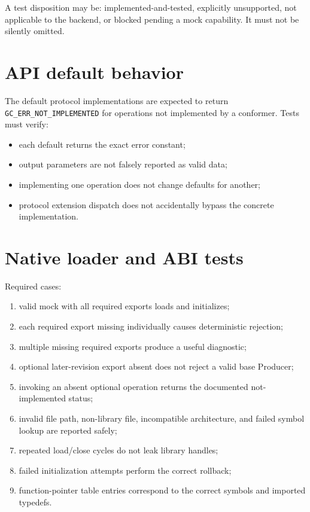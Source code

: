 \documentclass[11pt,a4paper]{report}
\begin{document}
A test disposition may be: implemented-and-tested, explicitly unsupported, not applicable to the backend, or blocked pending a mock capability. It must not be silently omitted.

\section{API default behavior}
The default protocol implementations are expected to return \texttt{GC\_ERR\_NOT\_IMPLEMENTED} for operations not implemented by a conformer. Tests must verify:
\begin{itemize}
  \item each default returns the exact error constant;
  \item output parameters are not falsely reported as valid data;
  \item implementing one operation does not change defaults for another;
  \item protocol extension dispatch does not accidentally bypass the concrete implementation.
\end{itemize}

\section{Native loader and ABI tests}
Required cases:
\begin{enumerate}
  \item valid mock with all required exports loads and initializes;
  \item each required export missing individually causes deterministic rejection;
  \item multiple missing required exports produce a useful diagnostic;
  \item optional later-revision export absent does not reject a valid base Producer;
  \item invoking an absent optional operation returns the documented not-implemented status;
  \item invalid file path, non-library file, incompatible architecture, and failed symbol lookup are reported safely;
  \item repeated load/close cycles do not leak library handles;
  \item failed initialization attempts perform the correct rollback;
  \item function-pointer table entries correspond to the correct symbols and imported typedefs.
\end{enumerate}
\end{document}
